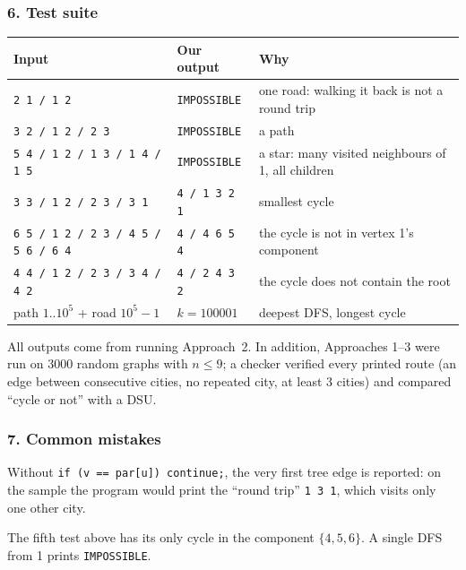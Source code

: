 \subsubsection*{6. Test suite}

\begin{testbox}
\centering\small
\begin{tabular}{@{}p{6.4cm}lp{5cm}@{}}
\toprule
\textbf{Input} & \textbf{Our output} & \textbf{Why} \\
\midrule
\texttt{2 1 / 1 2} & \texttt{IMPOSSIBLE} & one road: walking it back is not a round trip \\
\texttt{3 2 / 1 2 / 2 3} & \texttt{IMPOSSIBLE} & a path \\
\texttt{5 4 / 1 2 / 1 3 / 1 4 / 1 5} & \texttt{IMPOSSIBLE} & a star: many visited neighbours of 1, all children \\
\texttt{3 3 / 1 2 / 2 3 / 3 1} & \texttt{4 / 1 3 2 1} & smallest cycle \\
\texttt{6 5 / 1 2 / 2 3 / 4 5 / 5 6 / 6 4} & \texttt{4 / 4 6 5 4} & the cycle is not in vertex 1's component \\
\texttt{4 4 / 1 2 / 2 3 / 3 4 / 4 2} & \texttt{4 / 2 4 3 2} & the cycle does not contain the root \\
path $1..10^5$ + road $10^5{-}1$ & $k = 100001$ & deepest DFS, longest cycle \\
\bottomrule
\end{tabular}
\end{testbox}
All outputs come from running Approach~2. In addition, Approaches 1--3 were run on $3000$ random graphs with $n \le 9$; a checker verified every printed route (an edge between consecutive cities, no repeated city, at least 3 cities) and compared ``cycle or not'' with a DSU.

\subsubsection*{7. Common mistakes}

\begin{warningbox}
Without \texttt{if (v == par[u]) continue;}, the very first tree edge is reported: on the sample the program would print the ``round trip'' \texttt{1 3 1}, which visits only one other city.
\end{warningbox}

\begin{warningbox}
The fifth test above has its only cycle in the component $\{4,5,6\}$. A single DFS from 1 prints \texttt{IMPOSSIBLE}.
\end{warningbox}

